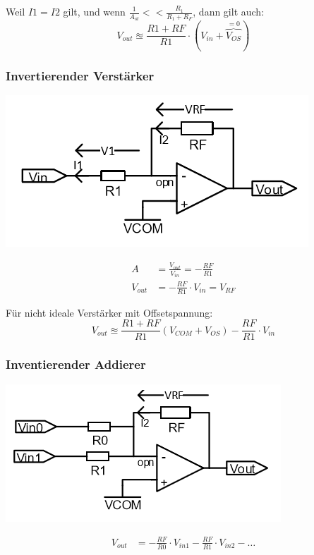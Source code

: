 Weil $I1 = I2$ gilt, und wenn $\frac{1}{A_{ol}} << \frac{R_1}{R_1 + R_F}$, dann gilt auch:
\[ V_{out} \approxeq \frac{R1 + RF}{R1} \cdot (V_{in} + \overbrace{V_{OS}}^{= 0})\]


\subsubsection{Invertierender Verstärker}
\begin{minipage}{0.25\textwidth}
	\includegraphics[width=\linewidth,keepaspectratio=true]{./Images/opamp_invertierendpng}
\end{minipage}%
\begin{minipage}{0.25\textwidth}
	\begin{align*}
		A &= \frac{V_{out}}{V_{in}} = -\frac{RF}{R1} \\
		V_{out} &= -\frac{RF}{R1} \cdot V_{in} = V_{RF}
	\end{align*}
\end{minipage}
Für nicht ideale Verstärker mit Offsetspannung:
\[
	V_{out} \approxeq \frac{R1 + RF}{R1}(V_{COM} + V_{OS}) - \frac{RF}{R1} \cdot V_{in}
\]


\subsubsection{Inventierender Addierer}
\begin{minipage}{0.20\textwidth}
	\includegraphics[width=\linewidth,keepaspectratio=true]{./Images/opamp_summierend}
\end{minipage}%
\begin{minipage}{0.30\textwidth}
	\begin{align*}
		V_{out} &= -\frac{RF}{R0} \cdot V_{in1} -\frac{RF}{R1} \cdot V_{in2} - \dots
	\end{align*}
\end{minipage}

